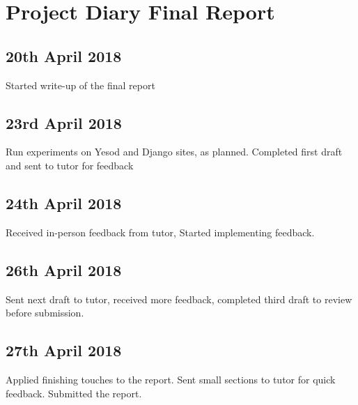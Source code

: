 \section{Project Diary Final Report}

\subsection{20th April 2018}
Started write-up of the final report

\subsection{23rd April 2018}
Run experiments on Yesod and Django sites, as planned.
Completed first draft and sent to tutor for feedback

\subsection{24th April 2018}
Received in-person feedback from tutor, Started
implementing feedback.

\subsection{26th April 2018}
Sent next draft to tutor, received more feedback,
completed third draft to review before submission.

\subsection{27th April 2018}
Applied finishing touches to the report. Sent small
sections to tutor for quick feedback. Submitted
the report.
